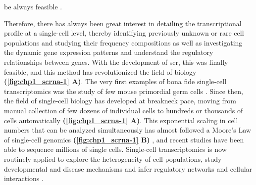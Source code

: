 be always feasible \textbf{\cite{kalisky_brief_2018}}.\\

\par Therefore, there has always been great interest in detailing the transcriptional profile at a single-cell level, thereby identifying previously unknown or rare cell populations and studying their frequency compositions as well as investigating the dynamic gene expression patterns and understand the regulatory relationships between genes. With the development of \acrfull{scr}, this was finally feasible, and this method has revolutionized the field of biology \textbf{(\autoref{fig:chp1_scrna-1} A)}. The very first examples of bona fide single-cell transcriptomics was the study of few mouse primordial germ cells \textbf{\cite{tang_mrna-seq_2009}}. Since then, the field of single-cell biology has developed at breakneck pace, moving from manual collection of few dozens of individual cells to hundreds or thousands of cells automatically \textbf{(\autoref{fig:chp1_scrna-1} A)}. This exponential scaling in cell numbers that can be analyzed simultaneously has almost followed a Moore’s Law of single-cell genomics \textbf{(\autoref{fig:chp1_scrna-1} B)} \textbf{\cite{aldridge_single_2020}}, and recent studies have been able to sequence millions of single cells. Single-cell transcriptomics is now routinely applied to explore the heterogeneity of cell populations, study developmental \textbf{\cite{cao_single-cell_2019,la_manno_molecular_2021}} and disease mechanisms \textbf{\cite{jordao_single-cell_2019,he_single-cell_2021}} and infer regulatory networks \textbf{\cite{wang_cell-type-specific_2020,fei_systematic_2022}} and cellular interactions \textbf{\cite{cherry_computational_2021,shamsi_comprehensive_2023}}. 



